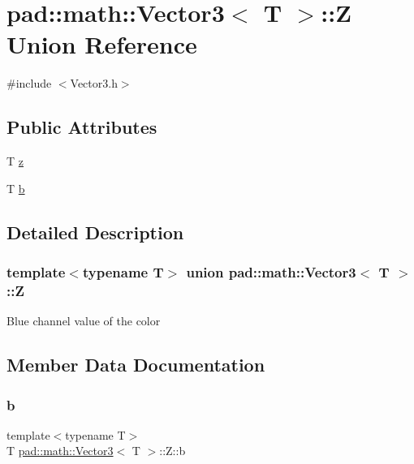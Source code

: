 \hypertarget{unionpad_1_1math_1_1_vector3_1_1_z}{}\section{pad\+:\+:math\+:\+:Vector3$<$ T $>$\+:\+:Z Union Reference}
\label{unionpad_1_1math_1_1_vector3_1_1_z}


{\ttfamily \#include $<$Vector3.\+h$>$}

\subsection*{Public Attributes}
\begin{DoxyCompactItemize}
\item 
T \mbox{\hyperlink{unionpad_1_1math_1_1_vector3_1_1_z_afb1c26400fed73d3c1b82620f4a06df1}{z}}
\item 
T \mbox{\hyperlink{unionpad_1_1math_1_1_vector3_1_1_z_a6ea97551b5fec387f9d12c23037565c7}{b}}
\end{DoxyCompactItemize}


\subsection{Detailed Description}
\subsubsection*{template$<$typename T$>$\newline
union pad\+::math\+::\+Vector3$<$ T $>$\+::Z}

Blue channel value of the color 

\subsection{Member Data Documentation}
\mbox{\label{unionpad_1_1math_1_1_vector3_1_1_z_a6ea97551b5fec387f9d12c23037565c7}} 
\subsubsection{\texorpdfstring{b}{b}}
{\footnotesize\ttfamily template$<$typename T$>$ \\
T \mbox{\hyperlink{structpad_1_1math_1_1_vector3}{pad\+::math\+::\+Vector3}}$<$ T $>$\+::Z\+::b}

